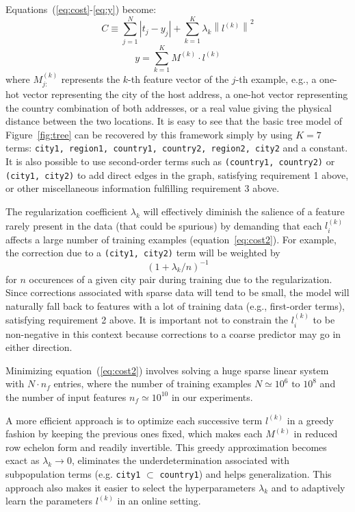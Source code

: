 \documentclass[10pt,a4paper,notitlepage,twocolumn]{article}
\begin{document}
Equations~(\ref{eq:cost}-\ref{eq:y}) become:
\begin{equation} \label{eq:cost2}
C \equiv \sum_{j=1}^N\left|t_j-y_j\right| + \sum_{k=1}^K \lambda_k \left\|l^{(k)}\right\|^2
\end{equation}
\begin{equation} \label{eq:y2}
y = \sum_{k=1}^K M^{(k)}\cdot l^{(k)}
\end{equation}
where $M_{j:}^{(k)}$ represents the $k$-th feature vector of the $j$-th example, e.g., a one-hot vector representing the city of the host address, a one-hot vector representing the country combination of both addresses, or a real value giving the physical distance between the two locations.
It is easy to see that the basic tree model of Figure~\ref{fig:tree} can be recovered by this framework simply by using $K=7$ terms: \texttt{city1, region1, country1, country2, region2, city2} and a constant.
%
It is also possible to use second-order terms such as \texttt{(country1, country2)} or \texttt{(city1, city2)} to add direct edges in the graph, satisfying requirement 1 above, or other miscellaneous information fulfilling requirement 3 above.

The regularization coefficient $\lambda_k$ will effectively diminish
the salience of a feature rarely present in the data (that could be
spurious) by demanding that each $l_i^{(k)}$ affects a large number
of training examples (equation~\ref{eq:cost2}).  For example, the
correction due to a \texttt{(city1, city2)} term will be weighted by
\begin{equation} \label{eq:regularize}
  (1+\lambda_k/n)^{-1}
\end{equation}
for $n$ occurences of a given city pair during training due to the
regularization.
Since corrections associated with sparse data will tend to be small, the model will naturally fall back to features with a lot of training data (e.g., first-order terms), satisfying requirement 2 above.
It is important not to constrain the $l^{(k)}_i$ to be non-negative in this context because corrections to a coarse predictor may go in either direction.

Minimizing equation~(\ref{eq:cost2}) involves solving a huge sparse
linear system with $N\cdot n_f$ entries, where the number of training
examples $N\simeq 10^6 \text{\ to } 10^8$ and the number of input
features $n_f\simeq10^{10}$ in our experiments.

A more efficient approach is to optimize each successive term $l^{(k)}$ in a greedy fashion by keeping the previous ones fixed, which makes each $M^{(k)}$ in reduced row echelon form and readily invertible.
This greedy approximation becomes exact as $\lambda_k\rightarrow 0$, eliminates the underdetermination associated with subpopulation terms (e.g. \texttt{city1} $\subset$ \texttt{country1}) and helps generalization.
This approach also makes it easier to select the hyperparameters $\lambda_k$ and to adaptively learn the parameters $l^{(k)}$ in an online setting.
\end{document}
